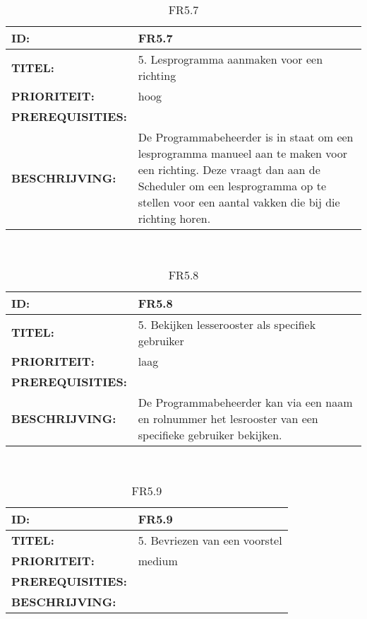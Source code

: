 \noindent\begin{table}[h]
            \begin{tabular}{l | p{10cm}}
                \textbf{ID:} & FR5.7 \\ \hline
                \textbf{TITEL:} & 5. Lesprogramma aanmaken voor een richting\\ \hline
                \textbf{PRIORITEIT:} &  hoog \\ \hline
                \textbf{PREREQUISITIES:} & \\ \hline
                \textbf{BESCHRIJVING:} & De Programmabeheerder is in staat om een lesprogramma manueel aan te maken voor een richting. Deze vraagt dan aan de Scheduler om een lesprogramma op te stellen voor een aantal vakken die bij die richting horen.\\ 
            \end{tabular}\\
            \caption{FR5.7}
            \label{tab:myfifteenthtable}
        \end{table}

\noindent\begin{table}[h]
            \begin{tabular}{l | p{10cm}}
                \textbf{ID:} & FR5.8 \\ \hline
                \textbf{TITEL:} & 5. Bekijken lesserooster als specifiek gebruiker\\ \hline
                \textbf{PRIORITEIT:} &  laag \\ \hline
                \textbf{PREREQUISITIES:} & \\ \hline
                \textbf{BESCHRIJVING:} & De Programmabeheerder kan via een naam en rolnummer het lesrooster van een specifieke gebruiker bekijken. \\ 
            \end{tabular}\\
            \caption{FR5.8}
            \label{tab:myfifteenthtable}
        \end{table}
        
\noindent\begin{table}[h]
            \begin{tabular}{l | p{10cm}}
                \textbf{ID:} & FR5.9 \\ \hline
                \textbf{TITEL:} & 5. Bevriezen van een voorstel\\ \hline
                \textbf{PRIORITEIT:} &  medium \\ \hline
                \textbf{PREREQUISITIES:} & \\ \hline
                \textbf{BESCHRIJVING:} & \\ 
            \end{tabular}\\
            \caption{FR5.9}
            \label{tab:myfifteenthtable}
        \end{table}
        
